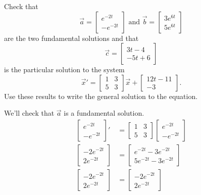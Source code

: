 \begin{example}
	Check that 
	\begin{equation*}
		\vec{a} = \begin{bmatrix}
			e^{-2t} \\
			-e^{-2t}
		\end{bmatrix} \text{ and } \vec{b} = \begin{bmatrix}
			3e^{6t} \\
			5e^{6t}
		\end{bmatrix}
	\end{equation*} 
	are the two fundamental solutions and that
	\begin{equation*}
		\vec{c} = \begin{bmatrix}
			3t - 4 \\
			-5t + 6
		\end{bmatrix}
	\end{equation*}
	is the particular solution to the system
	\begin{equation*}
		\vec{x}' = \begin{bmatrix}
			1 & 3 \\
			5 & 3
		\end{bmatrix} \vec{x} + \begin{bmatrix}
			12t - 11 \\
			-3
		\end{bmatrix}.
	\end{equation*}
	Use these results to write the general solution to the equation.
\end{example}
\noindent
We'll check that $\vec{a}$ is a fundamental solution.
\begin{align*}
	\begin{bmatrix}
		e^{-2t} \\
		-e^{-2t}
	\end{bmatrix}' &= \begin{bmatrix}
		1 & 3 \\
		5 & 3
	\end{bmatrix} \begin{bmatrix}
		e^{-2t} \\
		-e^{-2t}
	\end{bmatrix} \\
	\begin{bmatrix}
		-2e^{-2t} \\
		2e^{-2t}
	\end{bmatrix} &= \begin{bmatrix}
		e^{-2t} - 3e^{-2t} \\
		5e^{-2t} - 3e^{-2t}
	\end{bmatrix} \\
	\begin{bmatrix}
		-2e^{-2t} \\
		2e^{-2t}
	\end{bmatrix} &= \begin{bmatrix}
		-2e^{-2t} \\
		2e^{-2t}
	\end{bmatrix}
\end{align*}
